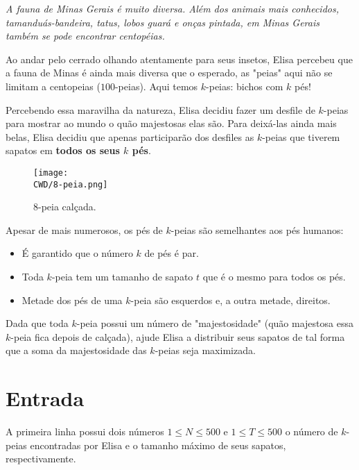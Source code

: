 %

\begin{center}
\textit{
  A fauna de Minas Gerais é muito diversa. Além dos animais mais conhecidos, tamanduás-bandeira, tatus, lobos guará e onças pintada, em Minas Gerais também se pode encontrar centopéias. 
  }
\end{center}
  
  Ao andar pelo cerrado olhando atentamente para seus insetos, Elisa percebeu que a fauna de Minas é ainda mais diversa que o esperado, as "peias"  aqui não se limitam a centopeias ($100$-peias). Aqui temos $k$-peias: bichos com $k$ pés!
    
  Percebendo essa maravilha da natureza, Elisa decidiu fazer um desfile de $k$-peias para mostrar ao mundo o quão majestosas elas são. Para deixá-las ainda mais belas, Elisa decidiu que apenas participarão dos desfiles as $k$-peias que tiverem sapatos em \textbf{todos os seus $k$ pés}. 
  
  \begin{figure}[H]
    \centering
    \texttt{[image: \\CWD/8-peia.png]}
    \caption{8-peia calçada.}
  \end{figure}

  Apesar de mais numerosos, os pés de $k$-peias são semelhantes aos pés humanos:
\begin{itemize}
  \item É garantido que o número $k$ de pés é par.
  \item Toda $k$-peia tem um tamanho de sapato $t$ que é o mesmo para todos os pés.
  \item Metade dos pés de uma $k$-peia são esquerdos e, a outra metade, direitos.
\end{itemize}

Dada que toda $k$-peia possui um número de "majestosidade"  (quão majestosa essa $k$-peia fica depois de calçada), ajude Elisa a distribuir seus sapatos de tal forma que a soma da majestosidade das $k$-peias seja maximizada.

%
\section*{Entrada}

A primeira linha possui dois números $1 \leq N \leq 500$ e $1 \leq T \leq 500$ o número de $k$-peias encontradas por Elisa e o tamanho máximo de seus sapatos, respectivamente.

